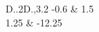 \documentclass[12pt]{article}
\begin{document}
{\small
\begin{tabular}{D{.}{.}{2}D{.}{,}{3.2}}
-0.6 & 1.5 \\
1.25 & -12.25
\end{tabular}}
\end{document}
